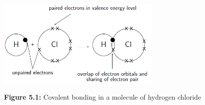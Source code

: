 {\begin{mdframed}[linewidth=4, leftmargin=40, rightmargin=40]
\begin{exercise}
\begin{enumerate}[noitemsep, label=\textbf{Step} \textbf{\arabic*}. ]
\begin{figure}[H]
    \begin{center}
    \label{m38704*uid7!!!underscore!!!media}\label{m38704*uid7!!!underscore!!!printimage}\includegraphics[width=8cm]{col11305.imgs/m38704_CG11C1_003.png} %
      \vspace{2pt}
    \vspace{\rubberspace}\par \begin{cnxcaption}
	  \small \textbf{Figure 5.1: }Covalent bonding in a molecule of hydrogen chloride
	\end{cnxcaption}
    \vspace{.1in}
    \end{center}
 \end{figure}       
        \end{enumerate}
    \end{exercise}
    \end{mdframed}
    }
    \noindent
\par
            \label{m38704*secfhsst!!!underscore!!!id119}\vspace{.5cm} 
      \noindent

